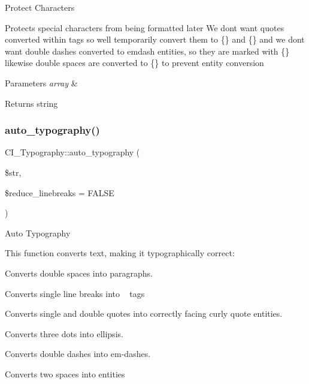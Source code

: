 Protect Characters

Protects special characters from being formatted later We don\textquotesingle{}t want quotes converted within tags so we\textquotesingle{}ll temporarily convert them to \{\} and \{\} and we don\textquotesingle{}t want double dashes converted to emdash entities, so they are marked with \{\} likewise double spaces are converted to \{\} to prevent entity conversion


\begin{DoxyParams}{Parameters}
{\em array} & \\
\hline
\end{DoxyParams}
\begin{DoxyReturn}{Returns}
string 
\end{DoxyReturn}
\mbox{\label{class_c_i___typography_a26ee2b1a53890470e05e49df7f698d33}} 
\subsubsection{\texorpdfstring{auto\+\_\+typography()}{auto\_typography()}}
{\footnotesize\ttfamily C\+I\+\_\+\+Typography\+::auto\+\_\+typography (\begin{DoxyParamCaption}\item[{}]{\$str,  }\item[{}]{\$reduce\+\_\+linebreaks = {\ttfamily FALSE} }\end{DoxyParamCaption})}

Auto Typography

This function converts text, making it typographically correct\+:
\begin{DoxyItemize}
\item Converts double spaces into paragraphs.
\item Converts single line breaks into ~\newline
 tags
\item Converts single and double quotes into correctly facing curly quote entities.
\item Converts three dots into ellipsis.
\item Converts double dashes into em-\/dashes.
\item Converts two spaces into entities
\end{DoxyItemize}


